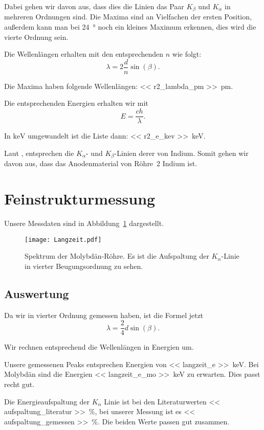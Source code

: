Dabei gehen wir davon aus, dass dies die Linien das Paar $K_\beta$ und
$K_\alpha$ in mehreren Ordnungen sind. Die Maxima sind an Vielfachen der ersten
Position, außerdem kann man bei \SI{24}{\degree} noch ein kleines Maximum
erkennen, dies wird die vierte Ordnung sein.

Die Wellenlängen erhalten mit den entsprechenden $n$ wie folgt:
\[
    \lambda = 2 \frac dn \sin(\beta).
\]

Die Maxima haben folgende Wellenlängen: \SIlist{<< r2_lambda_pm
>>}{\pico\meter}.

Die entsprechenden Energien erhalten wir mit
\[
    E = \frac{c h}{\lambda}.
\]

In $\si{\kilo\electronvolt}$ umgewandelt ist die Liste dann: \SIlist{<<
r2_e_kev >>}{\kilo\electronvolt}.

Laut \cite[Tabelle~1-2]{x-ray_data_booklet}, entsprechen die $K_\alpha$- und
$K_\beta$-Linien derer von Indium. Somit gehen wir davon aus, dass das
Anodenmaterial von Röhre~2 Indium ist.

\section{Feinstrukturmessung}

Unsere Messdaten sind in Abbildung~\ref{fig:Langzeit} dargestellt.

\begin{figure}[htbp]
    \centering
    \texttt{[image: Langzeit.pdf]}
    \caption{%
        Spektrum der Molybdän-Röhre. Es ist die Aufspaltung der
        $K_\alpha$-Linie in vierter Beugungsordnung zu sehen.
    }
    \label{fig:Langzeit}
\end{figure}

\subsection{Auswertung}

Da wir in vierter Ordnung gemessen haben, ist die Formel jetzt
\[
    \lambda = \frac24 d \sin(\beta).
\]

Wir rechnen entsprechend die Wellenlängen in Energien um.

Unsere gemessenen Peaks entsprechen Energien von \SIlist{<< langzeit_e
>>}{\kilo\electronvolt}. Bei Molybdän sind die Energien \SIlist{<<
langzeit_e_mo >>}{\kilo\electronvolt} zu erwarten.
\parencite[Tabelle~1-2]{x-ray_data_booklet} Dies passt recht gut.

Die Energieaufspaltung der $K_\alpha$ Linie ist bei den Literaturwerten \SI{<<
aufspaltung_literatur >>}{\percent}, bei unserer Messung ist es \SI{<<
aufspaltung_gemessen >>}{\percent}. Die beiden Werte passen gut zusammen.

